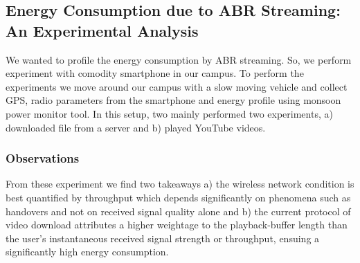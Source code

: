\subsection{Energy Consumption due to ABR Streaming: An Experimental Analysis}
We wanted to profile the energy consumption by ABR streaming. So, we perform experiment with comodity smartphone in our campus. To perform the experiments we move around our campus with a slow moving vehicle and collect GPS, radio parameters from the smartphone and energy profile using monsoon power monitor tool. In this setup, two mainly performed two experiments, a) downloaded file from a server and b) played YouTube videos.
\subsubsection{Observations}
From these experiment we find two takeaways a) the wireless network condition is best quantified by throughput which depends significantly on phenomena such as handovers and not on received signal quality alone and b) the current protocol of video download attributes a higher weightage to the playback-buffer length than the user’s instantaneous received signal strength or throughput, ensuing a significantly high energy consumption.